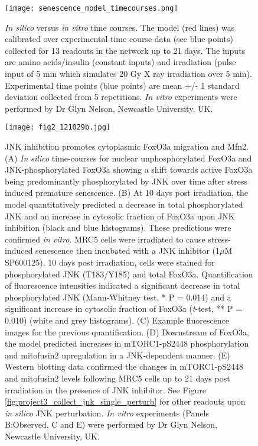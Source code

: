 \begin{figure}[tb]
	\begin{center}
		\texttt{[image: senescence\_model\_timecourses.png]}
		\caption[\emph{In silico} versus \emph{in vitro} time courses]{\emph{In silico} versus \emph{in vitro} time courses. The model (red lines) was calibrated over experimental time course data (see blue points) collected for 13 readouts in the network up to 21 days. The inputs are amino acids/insulin (constant inputs) and irradiation (pulse input of 5 min which simulates 20 Gy X ray irradiation over 5 min). Experimental time points (blue points) are mean +/- 1 standard deviation collected from 5 repetitions. \emph{In vitro} experiments were performed by Dr Glyn Nelson, Newcastle University, UK.}
		\label{fig:project3_senescence_model_timecourses}
	\end{center}
\end{figure}
\clearpage


\begin{figure}[tb]
	\begin{center}
		\texttt{[image: fig2\_121029b.jpg]}
		\caption[JNK inhibition promotes cytoplasmic FoxO3a migration and Mfn2]{JNK inhibition promotes cytoplasmic FoxO3a migration and Mfn2. (A) \emph{In silico} time-courses for nuclear unphosphorylated FoxO3a and JNK-phosphorylated FoxO3a showing a shift towards active FoxO3a being predominantly phosphorylated by JNK over time after stress induced premature senescence. (B) At 10 days post irradiation, the model quantitatively predicted a decrease in total phosphorylated JNK and an increase in cytosolic fraction of FoxO3a upon JNK inhibition (black and blue histograms). These predictions were confirmed \emph{in vitro}. MRC5 cells were irradiated to cause stress-induced senescence then incubated with a JNK inhibitor (1$\mu$M SP600125). 10 days post irradiation, cells were stained for phosphorylated JNK (T183/Y185) and total FoxO3a. Quantification of fluorescence intensities indicated a significant decrease in total phosphorylated JNK (Mann-Whitney test, * P = 0.014) and a significant increase in 
cytosolic fraction of FoxO3a (\emph{t}-test, ** P = 0.010) (white and grey histograms). (C) Example fluorescence images for the previous quantification. (D) Downstream of FoxO3a, the model predicted increases in mTORC1-pS2448 phosphorylation and mitofusin2 upregulation in a JNK-dependent manner. (E) Western blotting data confirmed the changes in mTORC1-pS2448 and mitofusin2 levels following MRC5 cells up to 21 days post irradiation in the presence of JNK inhibitor. See Figure \ref{fig:project3_collect_jnk_single_perturb} for other readouts upon \emph{in silico} JNK perturbation. \emph{In vitro} experiments (Panels B:Observed, C and E) were performed by Dr Glyn Nelson, Newcastle University, UK.}
		\label{fig:project3_fig2_121029b}
	\end{center}
\end{figure}
\clearpage

